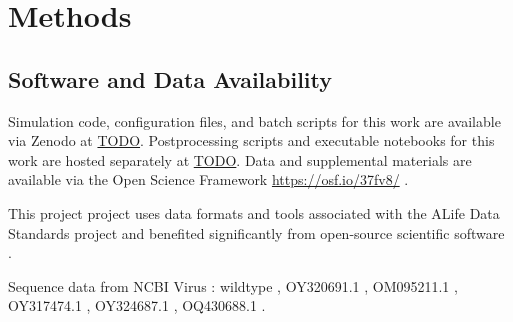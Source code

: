 \section{Methods} \label{sec:methods}



\subsection{Software and Data Availability} \label{sec:materials}

Simulation code, configuration files, and batch scripts for this work are available via Zenodo at \url{TODO}.
Postprocessing scripts and executable notebooks for this work are hosted separately at \url{TODO}.
Data and supplemental materials are available via the Open Science Framework \url{https://osf.io/37fv8/} \citep{foster2017open}.

This project project uses data formats and tools associated with the ALife Data Standards project \citep{lalejini2019data} and benefited significantly from open-source scientific software \citep{2020SciPy-NMeth,harris2020array,reback2020pandas,mckinney-proc-scipy-2010,waskom2021seaborn,hunter2007matplotlib,moreno2023teeplot,moreno2022hstrat,kerr2021covasim,dolson2024phylotrack,franceschi2024mlscluster,huertacepas2016ete3,moreno2024apc,lam2015numba,moreno2024dendropy,cock2009biopython,demaio2022phastsim}.

Sequence data from NCBI Virus \citep{brister2014ncbi}: wildtype \citep{wu2020new,MN908947.3}, OY320691.1 \citep{OY320691.1}, OM095211.1 \citep{OM095211.1}, OY317474.1 \citep{OY317474.1}, OY324687.1 \citep{OY324687.1}, OQ430688.1 \citep{OQ430688.1}.
